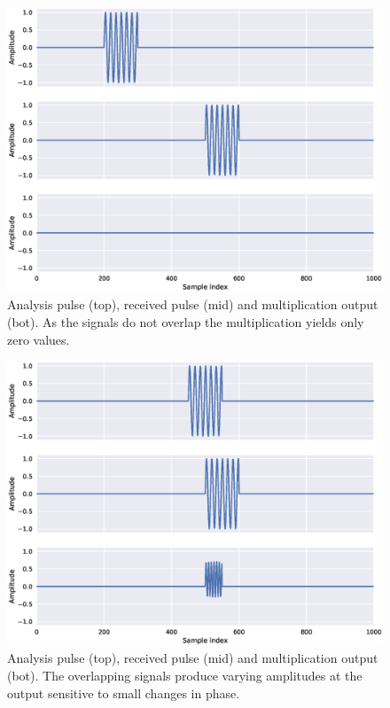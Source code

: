 \begin{figure}[h]
	\centering
	\includegraphics[scale=0.5]{figs_temp/mixing0}
	\caption{Analysis pulse (top), received pulse (mid) and multiplication output (bot). As the signals do not overlap the multiplication yields only zero values.}
	\label{fig:mix0}
\end{figure}

\begin{figure}[h]
	\centering
	\includegraphics[scale=0.5]{figs_temp/mixing1}
	\caption{Analysis pulse (top), received pulse (mid) and multiplication output (bot). The overlapping signals produce varying amplitudes at the output sensitive to small changes in phase.}
	\label{fig:mix1}
\end{figure}


